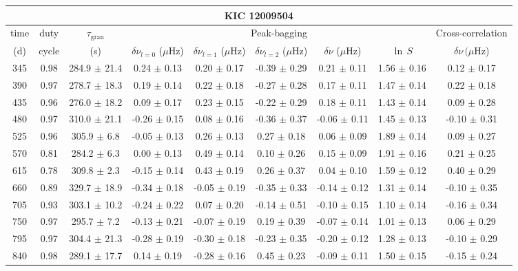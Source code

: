 \documentclass[twocolumn]{aastex61}%
\begin{document}
\begin{table*}[ht]\centering\fontsize{9.}{7.}\selectfont
\begin{tabular}{ccc|ccccc|c}
\multicolumn{9}{c}{KIC 12009504}\\ \hline\hline
time & duty & $\tau_\text{gran}$ &\multicolumn{5}{c|}{Peak-bagging}&Cross-correlation\\
(d)& cycle & (s)&$\delta\nu_{l=0}$ ($\mu$Hz) & $\delta\nu_{l=1}$ ($\mu$Hz) & $\delta\nu_{l=2}$ ($\mu$Hz) & $\delta\nu$ ($\mu$Hz)& $\ln\,S$ & $\delta\nu\,(\mu$Hz)\\\hline
345 & 0.98 & 284.9 $\pm$ 21.4 & 0.24 $\pm$ 0.13 & 0.20 $\pm$ 0.17 & -0.39 $\pm$ 0.29 & 0.21 $\pm$ 0.11 & 1.56 $\pm$ 0.16 & 0.12 $\pm$ 0.17\\
390 & 0.97 & 278.7 $\pm$ 18.3 & 0.19 $\pm$ 0.14 & 0.22 $\pm$ 0.18 & -0.27 $\pm$ 0.28 & 0.17 $\pm$ 0.11 & 1.47 $\pm$ 0.14 & 0.22 $\pm$ 0.18\\
435 & 0.96 & 276.0 $\pm$ 18.2 & 0.09 $\pm$ 0.17 & 0.23 $\pm$ 0.15 & -0.22 $\pm$ 0.29 & 0.18 $\pm$ 0.11 & 1.43 $\pm$ 0.14 & 0.09 $\pm$ 0.28\\
480 & 0.97 & 310.0 $\pm$ 21.1 & -0.26 $\pm$ 0.15 & 0.08 $\pm$ 0.16 & -0.36 $\pm$ 0.37 & -0.06 $\pm$ 0.11 & 1.45 $\pm$ 0.13 & -0.10 $\pm$ 0.31\\
525 & 0.96 & 305.9 $\pm$ 6.8 & -0.05 $\pm$ 0.13 & 0.26 $\pm$ 0.13 & 0.27 $\pm$ 0.18 & 0.06 $\pm$ 0.09 & 1.89 $\pm$ 0.14 & 0.09 $\pm$ 0.27\\
570 & 0.81 & 284.2 $\pm$ 6.3 & 0.00 $\pm$ 0.13 & 0.49 $\pm$ 0.14 & 0.10 $\pm$ 0.26 & 0.15 $\pm$ 0.09 & 1.91 $\pm$ 0.16 & 0.21 $\pm$ 0.25\\
615 & 0.78 & 309.8 $\pm$ 2.3 & -0.15 $\pm$ 0.14 & 0.43 $\pm$ 0.19 & 0.26 $\pm$ 0.37 & 0.04 $\pm$ 0.10 & 1.59 $\pm$ 0.12 & 0.40 $\pm$ 0.29\\
660 & 0.89 & 329.7 $\pm$ 18.9 & -0.34 $\pm$ 0.18 & -0.05 $\pm$ 0.19 & -0.35 $\pm$ 0.33 & -0.14 $\pm$ 0.12 & 1.31 $\pm$ 0.14 & -0.10 $\pm$ 0.35\\
705 & 0.93 & 303.1 $\pm$ 10.2 & -0.24 $\pm$ 0.22 & 0.07 $\pm$ 0.20 & -0.14 $\pm$ 0.51 & -0.10 $\pm$ 0.15 & 1.10 $\pm$ 0.14 & -0.16 $\pm$ 0.34\\
750 & 0.97 & 295.7 $\pm$ 7.2 & -0.13 $\pm$ 0.21 & -0.07 $\pm$ 0.19 & 0.19 $\pm$ 0.39 & -0.07 $\pm$ 0.14 & 1.01 $\pm$ 0.13 & 0.06 $\pm$ 0.29\\
795 & 0.97 & 304.4 $\pm$ 21.3 & -0.28 $\pm$ 0.19 & -0.30 $\pm$ 0.18 & -0.23 $\pm$ 0.35 & -0.20 $\pm$ 0.12 & 1.28 $\pm$ 0.13 & -0.10 $\pm$ 0.29\\
840 & 0.98 & 289.1 $\pm$ 17.7 & 0.14 $\pm$ 0.19 & -0.28 $\pm$ 0.16 & 0.45 $\pm$ 0.23 & -0.09 $\pm$ 0.11 & 1.50 $\pm$ 0.15 & -0.15 $\pm$ 0.24\\

\end{tabular}
\end{table*}
\end{document}
